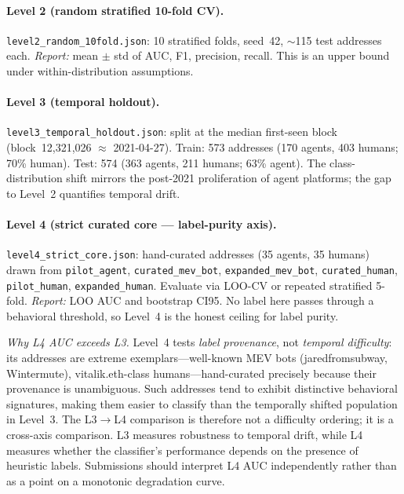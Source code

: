 \documentclass[10pt]{article}
\begin{document}
\paragraph{Level 2 (random stratified 10-fold CV).} \texttt{level2\_random\_10fold.json}: 10 stratified folds, seed~42, $\sim$115 test addresses each. \emph{Report:} mean $\pm$ std of AUC, F1, precision, recall. This is an upper bound under within-distribution assumptions.

\paragraph{Level 3 (temporal holdout).} \texttt{level3\_temporal\_holdout.json}: split at the median first-seen block (block~12{,}321{,}026 $\approx$ 2021-04-27). Train: 573 addresses (170 agents, 403 humans; 70\% human). Test: 574 (363 agents, 211 humans; 63\% agent). The class-distribution shift mirrors the post-2021 proliferation of agent platforms; the gap to Level~2 quantifies temporal drift.

\paragraph{Level 4 (strict curated core --- label-purity axis).} \texttt{level4\_strict\_core.json}: \datasetStrictCoreN{} hand-curated addresses (35 agents, 35 humans) drawn from \texttt{pilot\_agent}, \texttt{curated\_mev\_bot}, \texttt{expanded\_mev\_bot}, \texttt{curated\_human}, \texttt{pilot\_human}, \texttt{expanded\_human}. Evaluate via LOO-CV or repeated stratified 5-fold. \emph{Report:} LOO AUC and bootstrap CI95. No label here passes through a behavioral threshold, so Level~4 is the honest ceiling for label purity.

\emph{Why L4 AUC exceeds L3.} Level~4 tests \emph{label provenance}, not \emph{temporal difficulty}: its \datasetStrictCoreN{} addresses are extreme exemplars---well-known MEV bots (jaredfromsubway, Wintermute), vitalik.eth-class humans---hand-curated precisely because their provenance is unambiguous. Such addresses tend to exhibit distinctive behavioral signatures, making them easier to classify than the temporally shifted population in Level~3. The L3$\to$L4 comparison is therefore not a difficulty ordering; it is a cross-axis comparison. L3 measures robustness to temporal drift, while L4 measures whether the classifier's performance depends on the presence of heuristic labels. Submissions should interpret L4 AUC independently rather than as a point on a monotonic degradation curve.
\end{document}
